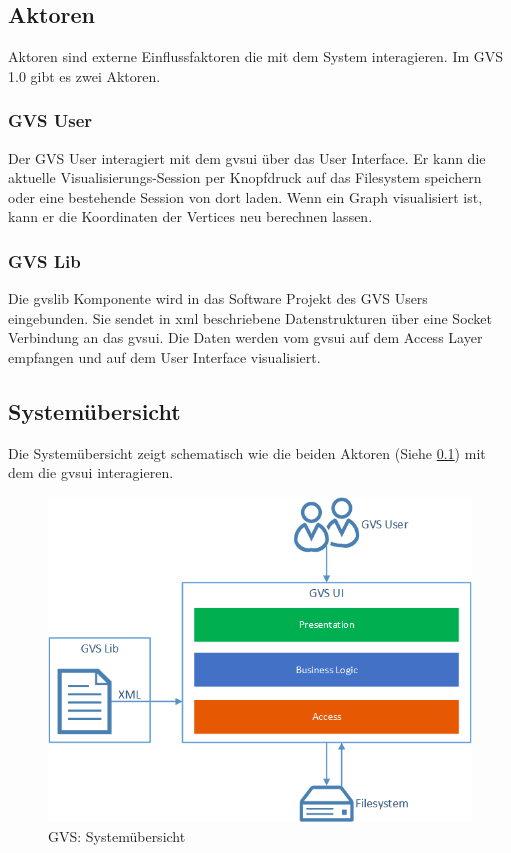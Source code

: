 \documentclass[11pt,a4paper,english,oneside]{book}
\numberwithin{equation}{chapter}
\begin{document}
	\subsection{Aktoren} \label{ssec:actors}
	Aktoren sind externe Einflussfaktoren die mit dem System interagieren. Im GVS 1.0 gibt es zwei Aktoren.
	
	\subsubsection{GVS User} \label{sssec:actor-user}
	Der GVS User interagiert mit dem \gls{gvsui} über das User Interface. Er kann die aktuelle Visualisierungs-Session per Knopfdruck auf das Filesystem speichern oder eine bestehende Session von dort laden. Wenn ein Graph visualisiert ist, kann er die Koordinaten der Vertices neu berechnen lassen.
	
	\subsubsection{GVS Lib} \label{sssec:actor-lib}
	Die \gls{gvslib} Komponente wird in das Software Projekt des GVS Users eingebunden. Sie sendet in \gls{xml} beschriebene Datenstrukturen über eine Socket Verbindung an das \gls{gvsui}. Die Daten werden vom \gls{gvsui} auf dem Access Layer empfangen und auf dem User Interface visualisiert.
	
	\subsection{Systemübersicht}
	Die Systemübersicht zeigt schematisch wie die beiden Aktoren (Siehe \ref{ssec:actors}) mit dem  die \gls{gvsui} interagieren.
	
	\begin{figure}[h!]
		\centering
		\includegraphics[width=0.5\linewidth]{assets/images/system_overview}
		\caption{GVS: Systemübersicht}
		\label{fig:gvs-systemuebersicht}
	\end{figure}
	
\end{document}
